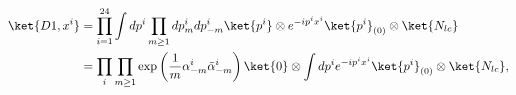 \begin{equation}
\begin{split}
 \ket{D1,x^i} &= 
    \prod_{i=1}^{24} \int dp^i \prod_{m \geq 1}
    dp^i_m dp^i_{-m} 
            \ket{p^i} \otimes e^{-i p^i x^i}\ket{p^i}_{(0)} 
  \otimes \ket{N_{lc}}\\ & 
 = \prod_i \prod_{m \geq 1 } \exp \left( 
     \frac1m \alpha^i_{-m} \tilde \alpha^i_{-m}\right) \ket{0} \otimes
   \int dp^i e^{-i p^i x^i} \ket{p^i}_{(0) } \otimes \ket{N_{lc}} ,
\end{split}
\end{equation}

